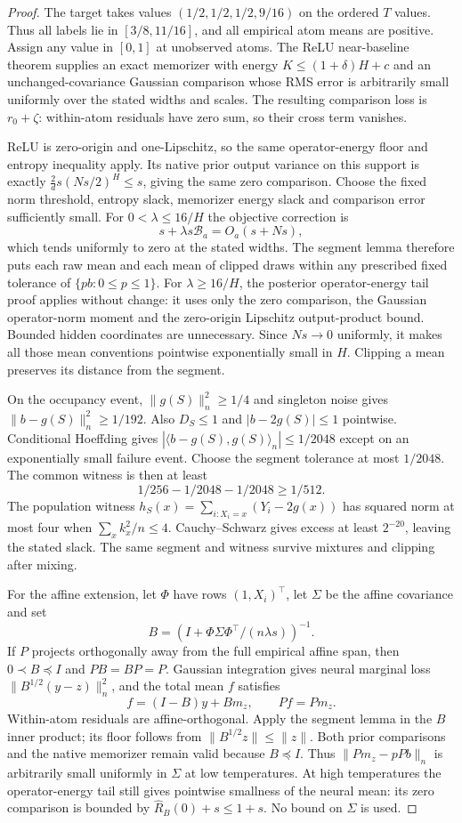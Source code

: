 \begin{proof}
The target takes values $(1/2,1/2,1/2,9/16)$ on the ordered $T$ values. Thus all labels lie in $[3/8,11/16]$, and all empirical atom means are positive. Assign any value in $[0,1]$ at unobserved atoms. The ReLU near-baseline theorem supplies an exact memorizer with energy $K\le(1+\delta)H+c$ and an unchanged-covariance Gaussian comparison whose RMS error is arbitrarily small uniformly over the stated widths and scales. The resulting comparison loss is $r_0+\zeta$: within-atom residuals have zero sum, so their cross term vanishes.

ReLU is zero-origin and one-Lipschitz, so the same operator-energy floor and entropy inequality apply. Its native prior output variance on this support is exactly $\frac2d s(Ns/2)^H\le s$, giving the same zero comparison. Choose the fixed norm threshold, entropy slack, memorizer energy slack and comparison error sufficiently small. For $0<\lambda\le16/H$ the objective correction is
\[
 s+\lambda s\mathcal B_a=O_a(s+Ns),
\]
which tends uniformly to zero at the stated widths. The segment lemma therefore puts each raw mean and each mean of clipped draws within any prescribed fixed tolerance of $\{pb:0\le p\le1\}$. For $\lambda\ge16/H$, the posterior operator-energy tail proof applies without change: it uses only the zero comparison, the Gaussian operator-norm moment and the zero-origin Lipschitz output-product bound. Bounded hidden coordinates are unnecessary. Since $Ns\to0$ uniformly, it makes all those mean conventions pointwise exponentially small in $H$. Clipping a mean preserves its distance from the segment.

On the occupancy event, $\|g(S)\|_n^2\ge1/4$ and singleton noise gives
$\|b-g(S)\|_n^2\ge1/192$. Also $D_S\le1$ and
$|b-2g(S)|\le1$ pointwise. Conditional Hoeffding gives
$|\langle b-g(S),g(S)\rangle_n|\le1/2048$
except on an exponentially small failure event. Choose the segment tolerance at most $1/2048$. The common witness is then at least
\[
 1/256-1/2048-1/2048\ge1/512.
\]
The population witness $h_S(x)=\sum_{i:X_i=x}(Y_i-2g(x))$ has squared norm at most four when $\sum_xk_x^2/n\le4$. Cauchy--Schwarz gives excess at least $2^{-20}$, leaving the stated slack. The same segment and witness survive mixtures and clipping after mixing.

For the affine extension, let $\Phi$ have rows $(1,X_i)^\top$, let $\Sigma$ be the affine covariance and set
\[
 B=(I+\Phi\Sigma\Phi^\top/(n\lambda s))^{-1}.
\]
If $P$ projects orthogonally away from the full empirical affine span, then
$0\prec B\preceq I$ and $PB=BP=P$. Gaussian integration gives neural marginal loss $\|B^{1/2}(y-z)\|_n^2$, and the total mean $f$ satisfies
\[
 f=(I-B)y+Bm_z,\qquad Pf=Pm_z.
\]
Within-atom residuals are affine-orthogonal. Apply the segment lemma in the $B$ inner product; its floor follows from $\|B^{1/2}z\|\le\|z\|$. Both prior comparisons and the native memorizer remain valid because $B\preceq I$. Thus
$\|P m_z-pP b\|_n$ is arbitrarily small uniformly in $\Sigma$ at low temperatures. At high temperatures the operator-energy tail still gives pointwise smallness of the neural mean: its zero comparison is bounded by $\widehat R_B(0)+s\le1+s$. No bound on $\Sigma$ is used.


\end{proof}
